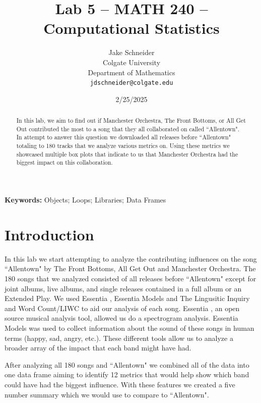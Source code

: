 \documentclass{article}\usepackage[]{graphicx}\usepackage[]{xcolor}
\begin{document}
\vspace{-1in}
\title{Lab 5 -- MATH 240 -- Computational Statistics}

\author{
  Jake Schneider \\
  Colgate University  \\
  Department of Mathematics  \\
  {\tt jdschneider@colgate.edu}
}

\date{2/25/2025}

\maketitle

\begin{multicols}{2}
\begin{abstract}
In this lab, we aim to find out if Manchester Orchestra, The Front Bottoms, or All Get Out contributed the most to a song that they all collaborated on called ``Allentown". In attempt to answer this question we downloaded all releases before ``Allentown" totaling to 180 tracks that we analyze various metrics on. Using these metrics we showcased multiple box plots that indicate to us that Manchester Orchestra had the biggest impact on this collaboration. 


\end{abstract}

\noindent \textbf{Keywords:} Objects; Loops; Libraries; Data Frames

\section{Introduction}
In this lab we start attempting to analyze the contributing influences on the song ``Allentown" by The Front Bottoms, All Get Out and Manchester Orchestra. The 180 songs that we analyzed consisted of all releases before ``Allentown" except for joint albums, live albums, and single releases contained in a full album or an Extended Play. We used Essentia \citep{essentia}, Essentia Models \citep{essentiamodels} and The Lingusitic Inquiry and Word Count/LIWC \citep{LIWC} to aid our analysis of each song. Essentia , an open source musical analysis tool, allowed us do a spectrogram analysis. Essentia Models  was used to collect information about the sound of these songs in human terms (happy, sad, angry, etc.). These different tools allow us to analyze a broader array of the impact that each band might have had.  

After analyzing all 180 songs and ``Allentown" we combined all of the data into one data frame aiming to identify 12 metrics that would help show which band could have had the biggest influence. With these features we created a five number summary which we would use to compare to ``Allentown". 




\end{multicols}
\end{document}
